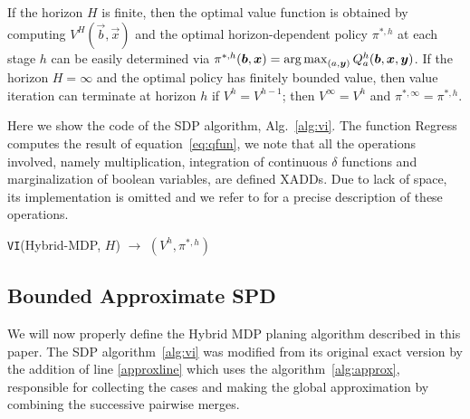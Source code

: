 If the horizon $H$ is finite, then the optimal value function is
obtained by computing $V^H(\vec{b},\vec{x})$ and the optimal
horizon-dependent policy $\pi^{*,h}$ at each stage $h$ can be easily
determined via $\pi^{*,h}(\vec{b},\vec{x}) = \argmax_{(a, \vec{y} )} Q^h_a(\vec{b},\vec{x},\vec{y})$.  If the horizon $H
= \infty$ and the optimal policy has finitely bounded value, then
value iteration can terminate at horizon $h$ if $V^{h} = V^{h-1}$;
then $V^\infty = V^h$ and $\pi^{*,\infty} = \pi^{*,h}$.

Here we show the code of the SDP algorithm, Alg.~\ref{alg:vi}. The function Regress computes the result of equation~\ref{eq:qfun}, we note that all the operations involved, namely multiplication, integration of continuous $\delta$ functions and marginalization of boolean variables, are defined XADDs. Due to lack of space, its implementation is omitted and we refer to \cite{zamani12} for a precise description of these operations.

\incmargin{.5em}
\linesnumbered
\begin{algorithm}[th!]
\vspace{-.5mm}
\dontprintsemicolon
{}
\caption{\footnotesize \texttt{VI}(Hybrid-MDP, $H$) $\longrightarrow$ $(V^h,\pi^{*,h})$ \label{alg:vi}}
\vspace{-1mm}
\end{algorithm}
\decmargin{.5em}


\subsection{Bounded Approximate SPD}
We will now properly define the Hybrid MDP planing algorithm described in this paper. The SDP algorithm~\ref{alg:vi} was modified from its original exact version by the addition of line \ref{approxline} which uses the algorithm~\ref{alg:approx}, responsible for collecting the cases and making the global approximation by combining the successive pairwise merges.

